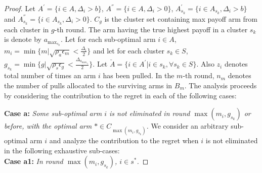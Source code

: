 \begin{proof}

Let $A^{'}=\lbrace i \in A,\Delta_{i}> b\rbrace$,  $A^{''}=\lbrace i \in A, \Delta_{i} > 0\rbrace$, $A^{'}_{s_{k}}=\lbrace i \in A_{s_{k}},\Delta_{i}> b\rbrace$ and $A^{''}_{s_{k}}=\lbrace i \in A_{s_{k}}, \Delta_{i} > 0 \rbrace$. $C_{g}$ is the cluster set containing max payoff arm from each cluster in $g$-th round. The arm having the true highest payoff in a cluster $s_{k}$ is denote by $a_{\max_{s_{k}}}$. Let for each sub-optimal arm ${i}\in A$, $m_{i}=\min{\lbrace m|\sqrt{\rho_{a}\epsilon_{m}} < \frac{\Delta_{i}}{2} \rbrace}$ and let for each cluster $s_{k}\in S$, $g_{s_{k}}=\min{\lbrace g|\sqrt{\rho_{s}\epsilon_{g}} < \frac{\Delta_{a_{\max_{s_{k}}}}}{2} \rbrace}$. 
Let $\check{A}=\lbrace {i}\in A^{'} | {i}\in s_{k} , \forall s_{k}\in S \rbrace$. Also $z_{i}$ denotes total number of times an arm $i$ has been pulled. In the $m$-th round, $n_{m}$ denotes the number of pulls allocated to the surviving arms in $B_{m}$. 
The analysis proceeds by considering the contribution to the regret in each of the following cases:

\textbf{Case a:} \textit{Some sub-optimal arm ${i}$ is not eliminated in round $\max(m_{i},g_{s_{k}})$ or before, with the optimal arm ${*}\in C_{\max(m_{i},g_{s_{k}})}$.}
We consider an arbitrary sub-optimal arm ${i}$ and analyze the contribution to the regret when $i$ is not eliminated in the following exhaustive sub-cases:\\
\textbf{Case a1:} \textit{In round $\max(m_{i},g_{s_{k}})$, ${i} \in s^{*}$.}


\end{proof}
